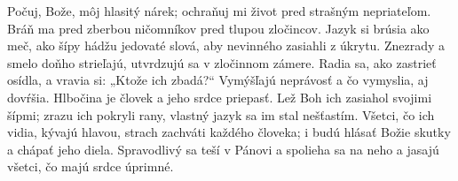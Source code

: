 Počuj, Bože, môj hlasitý nárek;
ochraňuj mi život pred strašným nepriateľom.
\versseparator
Bráň ma pred zberbou ničomníkov
pred tlupou zločincov.
\versseparator
Jazyk si brúsia ako meč,
ako šípy hádžu jedovaté slová,
aby nevinného zasiahli z úkrytu.
\versseparator
Znezrady a smelo doňho strieľajú,
utvrdzujú sa v zločinnom zámere.
\versseparator
Radia sa, ako zastrieť osídla,
a vravia si: „Ktože ich zbadá?“
\versseparator
Vymýšľajú neprávosť a čo vymyslia, aj dovŕšia.
Hlbočina je človek a jeho srdce priepasť.
\versseparator
Lež Boh ich zasiahol svojimi šípmi;
zrazu ich pokryli rany,
vlastný jazyk sa im stal nešťastím.
\versseparator
Všetci, čo ich vidia, kývajú hlavou,
strach zachváti každého človeka;
\versseparator
i budú hlásať Božie skutky
a chápať jeho diela.
\versseparator
Spravodlivý sa teší v Pánovi a spolieha sa na neho
a jasajú všetci, čo majú srdce úprimné.